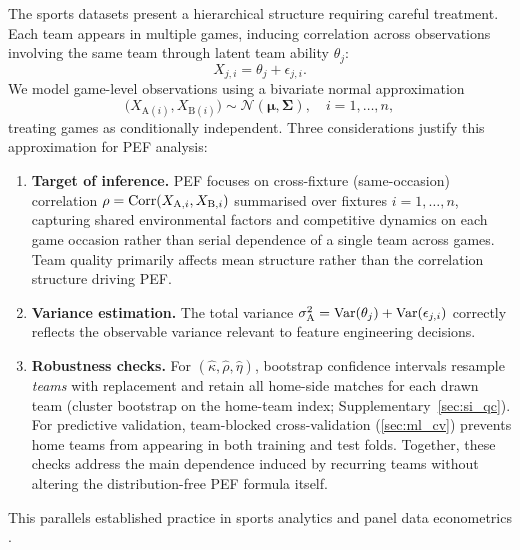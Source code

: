 The sports datasets present a hierarchical structure requiring careful treatment. Each team appears in multiple games, inducing correlation across observations involving the same team through latent team ability $\theta_{j}$:
\begin{equation}
  X_{j,i} = \theta_{j} + \epsilon_{j,i}.
\end{equation}
We model game-level observations using a bivariate normal approximation
\begin{equation}
  \bigl(X_{\mathrm{A}(i)}, X_{\mathrm{B}(i)}\bigr) \sim \mathcal{N}(\boldsymbol{\mu},\boldsymbol{\Sigma}),
  \quad i=1,\ldots,n,
\end{equation}
treating games as conditionally independent. Three considerations justify this approximation for PEF analysis:
\begin{enumerate}
  \item \textbf{Target of inference.} PEF focuses on cross-fixture (same-occasion) correlation $\rho=\operatorname{Corr}(X_{\mathrm{A},i},X_{\mathrm{B},i})$ summarised over fixtures $i=1,\ldots,n$, capturing shared environmental factors and competitive dynamics on each game occasion rather than serial dependence of a single team across games. Team quality primarily affects mean structure rather than the correlation structure driving PEF.
  \item \textbf{Variance estimation.} The total variance $\sigma^{2}_{\mathrm{A}}=\operatorname{Var}(\theta_{j})+\operatorname{Var}(\epsilon_{j,i})$ correctly reflects the observable variance relevant to feature engineering decisions.
  \item \textbf{Robustness checks.} For $(\hat\kappa,\hat\rho,\hat\eta)$, bootstrap confidence intervals resample \emph{teams} with replacement and retain all home-side matches for each drawn team (cluster bootstrap on the home-team index; Supplementary~\cref{sec:si_qc}). For predictive validation, team-blocked cross-validation (\cref{sec:ml_cv}) prevents home teams from appearing in both training and test folds. Together, these checks address the main dependence induced by recurring teams without altering the distribution-free PEF formula itself.
\end{enumerate}
This parallels established practice in sports analytics \parencite{benaim2006,owen2014} and panel data econometrics \parencite{cameron2015,wooldridge2010}.

